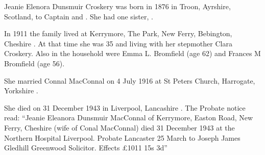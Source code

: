 
Jeanie Elenora Dunsmuir Croskery was born in 1876 in Troon, Ayrshire, Scotland, to Captain  and .
She had one sister, .

In 1911 the family lived at Kerrymore, The Park, New Ferry, Bebington, Cheshire \cite{JCroskeryResidence1}. At that time she was 35 and living with her stepmother Clara Croskery.  Also in the household were Emma L. Bromfield (age 62) and Frances M Bromfield (age 56). 

She married Connal MacConnal on 4 July 1916 at St Peters Church, Harrogate, Yorkshire \cite{JCroskeryMarriage}.

She died on 31 December 1943 in	Liverpool, Lancashire \cite{JCroskeryDeath}.  The Probate notice read:
``Jeanie Eleanora Dunsmuir MacConnal of Kerrymore, Easton Road, New Ferry, Cheshire (wife of Conal MacConnal) died 31 December 1943 at the Northern Hospital Liverpool.
Probate Lancaster 25 March to Joseph James Gledhill Greenwood Solicitor. Effects \pounds 1011 15s 3d''
